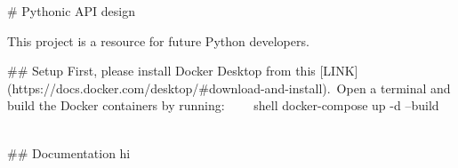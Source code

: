 \documentclass[english, 12pt, a4paper]{article}
\begin{document}



\clearpage


%     

\clearpage

\setcounter{tocdepth}{2}
{\tableofcontents}






\clearpage



% 

\setlength{\parindent}{2ex}





\begin{markdown}
# Pythonic API design

This project is a resource for future Python developers.

## Setup
First, please install Docker Desktop from this [LINK](https://docs.docker.com/desktop/#download-and-install).\
Open a terminal and build the Docker containers by running:
~~~~shell
docker-compose up -d --build
~~~~

## Documentation
hi

\end{markdown}



% 




\end{document}
